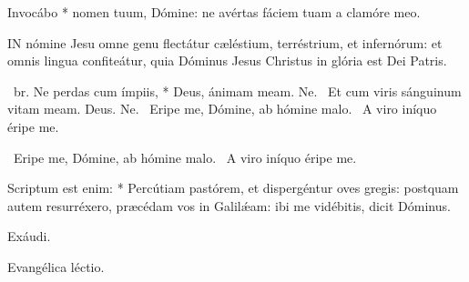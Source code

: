 
 Invocábo * nomen tuum, Dómine: ne avértas fáciem tuam a clamóre meo.


\lettrine[lines=2]{I}{N} nómine Jesu omne genu flectátur cæléstium, terréstrium, et infernórum: et omnis lingua confiteátur, quia Dóminus Jesus Christus in glória est Dei Patris.

\R\ br. Ne perdas cum ímpiis, * Deus, ánimam meam. Ne. \V\ Et cum viris sánguinum vitam meam. Deus. Ne. \V\ Eripe me, Dómine, ab hómine malo. \R\ A viro iníquo éripe me.



\V\ Eripe me, Dómine, ab hómine malo. \R\ A viro iníquo éripe me.

 Scriptum est enim: * Percútiam pastórem, et dispergéntur oves gregis: postquam autem resurréxero, præcédam vos in Galilǽam: ibi me vidébitis, dicit Dóminus.


\sectionornament




 Exáudi.

 Evangélica léctio.



